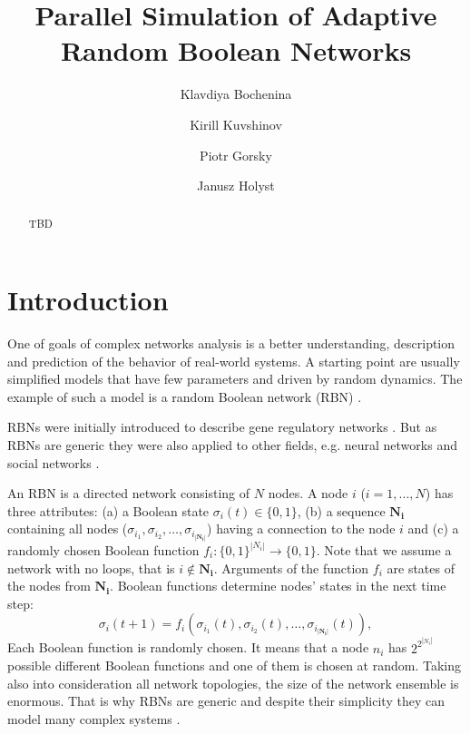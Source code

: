 \documentclass[procedia]{easychair}
\title{Parallel Simulation of Adaptive Random Boolean Networks}
\author{
	Klavdiya Bochenina\inst{1}
	\and
	Kirill Kuvshinov\inst{1}
	\and
	Piotr Gorsky\inst{2}
	\and
	Janusz Holyst\inst{1}\inst{2}
}
\institute{
	ITMO University, St. Petersburg, Russian Federation
	\and
	Warsaw University of Technology, Warsaw, Poland
}
\begin{document}
	
	\maketitle
	
	
	\begin{abstract}
		TBD
	\end{abstract}
	
	
	\section{Introduction}
	\label{sect:introduction}
	
	One of goals of complex networks analysis is a better understanding, description and prediction of the behavior of real-world systems. A starting point are usually simplified models that have few parameters and driven by random dynamics. The example of such a model is a random Boolean network (RBN) \cite{gershenson04,drossel2008random,cheng2011random,aldana2003boolean}. 
	
	RBNs were initially introduced to describe gene regulatory networks \cite{kauffman1969metabolic,kauffman2004ensemble}. But as RBNs are generic they were also applied to other fields, e.g. neural networks and social networks \cite{drossel2008random}.
	
	An RBN is a directed network consisting of ${N}$ nodes. A node $i$ ($i=1, ..., N$) has three attributes: (a) a Boolean state $\sigma_i(t)\in \{0,1\}$, (b) a sequence $\boldsymbol{N_i}$ containing all nodes ($\sigma_{i_1}, \sigma_{i_2}, \ldots, \sigma_{i_{|\boldsymbol{N_i}|}}$) having a connection to the node $i$ and (c) a randomly chosen Boolean function $f_i: \{0,1\}^{|N_i|} \rightarrow \{0,1\}$. 
	Note that we assume a network with no loops, that is  $i \not\in \boldsymbol{N_i}$. 
	Arguments of the function $f_i$ are states of the nodes from $\boldsymbol{N_i}$. Boolean functions determine nodes' states in the next time step:
	\begin{equation}
	\sigma_i(t+1) = f_i(\sigma_{i_1}(t), \sigma_{i_2}(t), \ldots, \sigma_{i_{|\boldsymbol{N_i}|}}(t)),
	\label{eq:update}
	\end{equation}
	Each Boolean function is randomly chosen. It means that a node $n_i$ has $2^{2^{|N_i|}}$ possible different Boolean functions and one of them is chosen at random.
	Taking also into consideration all network topologies, the size of the network ensemble is enormous. That is why RBNs are generic and despite their simplicity they can model many complex systems \cite{drossel2008random}. 
	
\end{document}
